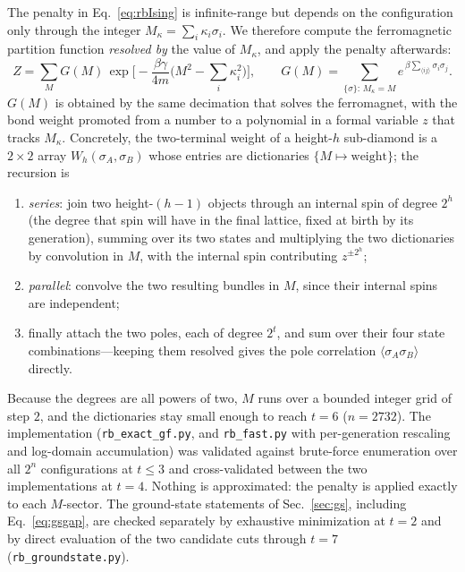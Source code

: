 \documentclass[preprint,12pt]{elsarticle}
\begin{document}
The penalty in Eq.~\eqref{eq:rbIsing} is infinite-range but depends on the
configuration only through the integer $M_\kappa=\sum_i\kappa_i\sigma_i$. We
therefore compute the ferromagnetic partition function \emph{resolved by} the
value of $M_\kappa$, and apply the penalty afterwards:
\begin{equation}
  Z=\sum_{M} G(M)\,
    \exp\!\Big[-\frac{\beta\gamma}{4m}\Big(M^2-\sum_i\kappa_i^2\Big)\Big],
  \qquad
  G(M)=\!\!\sum_{\{\sigma\}:\,M_\kappa=M}\!\! e^{\,\beta\sum_{\langle ij\rangle}
       \sigma_i\sigma_j}.
  \label{eq:gf}
\end{equation}
$G(M)$ is obtained by the same decimation that solves the ferromagnet, with the
bond weight promoted from a number to a polynomial in a formal variable $z$
that tracks $M_\kappa$. Concretely, the two-terminal weight of a height-$h$
sub-diamond is a $2\times2$ array $W_h(\sigma_A,\sigma_B)$ whose entries are
dictionaries $\{M\mapsto\text{weight}\}$; the recursion is
\begin{enumerate}
\item \emph{series}: join two height-$(h{-}1)$ objects through an internal spin
      of degree $2^{h}$ (the degree that spin will have in the final lattice,
      fixed at birth by its generation), summing over its two states and
      multiplying the two dictionaries by convolution in $M$, with the internal
      spin contributing $z^{\pm2^{h}}$;
\item \emph{parallel}: convolve the two resulting bundles in $M$, since their
      internal spins are independent;
\item finally attach the two poles, each of degree $2^t$, and sum over their
      four state combinations---keeping them resolved gives the pole
      correlation $\langle\sigma_A\sigma_B\rangle$ directly.
\end{enumerate}
Because the degrees are all powers of two, $M$ runs over a bounded integer grid
of step $2$, and the dictionaries stay small enough to reach $t=6$
($n=2732$). The implementation (\texttt{rb\_exact\_gf.py}, and
\texttt{rb\_fast.py} with per-generation rescaling and log-domain
accumulation) was validated against brute-force enumeration over all $2^n$
configurations at $t\le3$ and cross-validated between the two implementations
at $t=4$. Nothing is approximated: the penalty is applied exactly to each
$M$-sector. The ground-state statements of Sec.~\ref{sec:gs}, including
Eq.~\eqref{eq:gsgap}, are checked separately by exhaustive minimization at
$t=2$ and by direct evaluation of the two candidate cuts through $t=7$
(\texttt{rb\_groundstate.py}).
\end{document}
